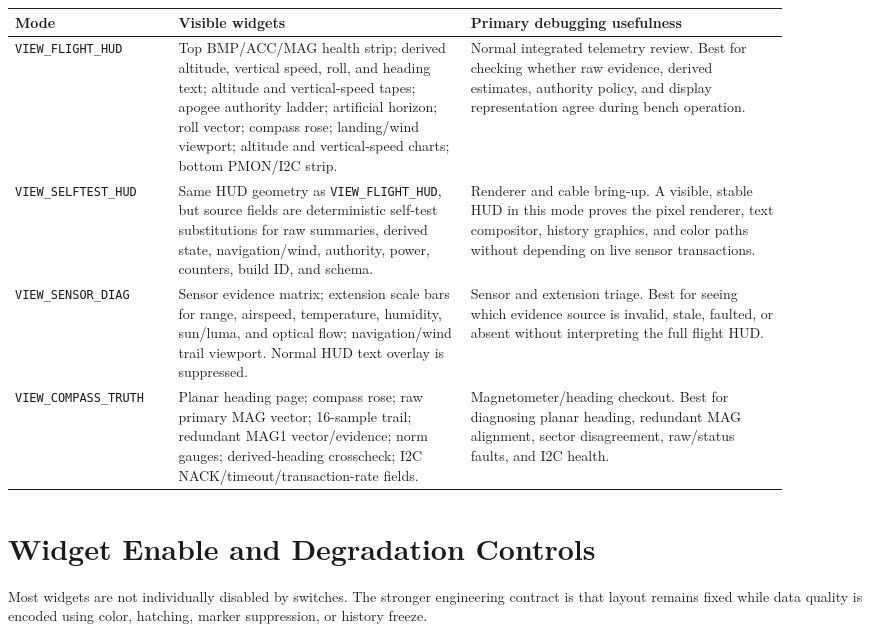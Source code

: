 \documentclass{article}
\newcommand{\sig}[1]{\begingroup\nolinkurl{#1}\endgroup}
\begin{document}
\begin{longtable}{p{0.19\linewidth} p{0.34\linewidth} p{0.37\linewidth}}
\toprule
\textbf{Mode} & \textbf{Visible widgets} & \textbf{Primary debugging usefulness} \\
\midrule
\endhead
\sig{VIEW_FLIGHT_HUD} &
Top BMP/ACC/MAG health strip; derived altitude, vertical speed, roll, and
heading text; altitude and vertical-speed tapes; apogee authority ladder;
artificial horizon; roll vector; compass rose; landing/wind viewport; altitude
and vertical-speed charts; bottom PMON/I2C strip. &
Normal integrated telemetry review.  Best for checking whether raw evidence,
derived estimates, authority policy, and display representation agree during
bench operation. \\

\sig{VIEW_SELFTEST_HUD} &
Same HUD geometry as \sig{VIEW_FLIGHT_HUD}, but source fields are deterministic
self-test substitutions for raw summaries, derived state, navigation/wind,
authority, power, counters, build ID, and schema. &
Renderer and cable bring-up.  A visible, stable HUD in this mode proves the
pixel renderer, text compositor, history graphics, and color paths without
depending on live sensor transactions. \\

\sig{VIEW_SENSOR_DIAG} &
Sensor evidence matrix; extension scale bars for range, airspeed, temperature,
humidity, sun/luma, and optical flow; navigation/wind trail viewport.  Normal
HUD text overlay is suppressed. &
Sensor and extension triage.  Best for seeing which evidence source is invalid,
stale, faulted, or absent without interpreting the full flight HUD. \\

\sig{VIEW_COMPASS_TRUTH} &
Planar heading page; compass rose; raw primary MAG vector; 16-sample trail;
redundant MAG1 vector/evidence; norm gauges; derived-heading crosscheck; I2C
NACK/timeout/transaction-rate fields. &
Magnetometer/heading checkout.  Best for diagnosing planar heading, redundant
MAG alignment, sector disagreement, raw/status faults, and I2C health. \\
\bottomrule
\end{longtable}

\section{Widget Enable and Degradation Controls}

Most widgets are not individually disabled by switches.  The stronger
engineering contract is that layout remains fixed while data quality is encoded
using color, hatching, marker suppression, or history freeze.
\end{document}
